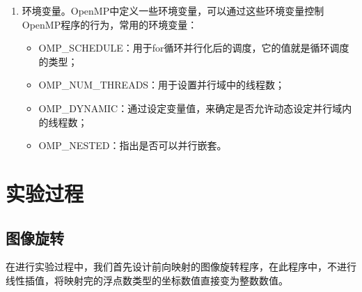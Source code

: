 \documentclass[UTF-8, a4paper, 12pt]{ctexart}
\begin{document}
\begin{enumerate}
\begin{itemize}
\end{itemize}
\item 环境变量。OpenMP中定义一些环境变量，可以通过这些环境变量控制OpenMP程序的行为，常用的环境变量：
\begin{itemize}
    \item OMP\_SCHEDULE：用于for循环并行化后的调度，它的值就是循环调度的类型；  
    \item OMP\_NUM\_THREADS：用于设置并行域中的线程数；  
    \item OMP\_DYNAMIC：通过设定变量值，来确定是否允许动态设定并行域内的线程数；  
    \item OMP\_NESTED：指出是否可以并行嵌套。
\end{itemize}
\end{enumerate}

\newpage
\section{实验过程}

\subsection{图像旋转}

在进行实验过程中，我们首先设计前向映射的图像旋转程序，在此程序中，不进行线性插值，将映射完的浮点数类型的坐标数值直接变为整数数值。
\end{document}
